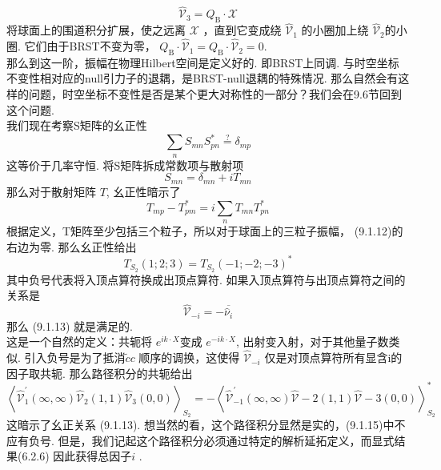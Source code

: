 \begin{equation}
	\hat{\mathcal{V}}_{3}=Q_{\mathrm{B}} \cdot \mathscr{X}
\end{equation}
将球面上的围道积分扩展，使之远离 $\mathscr{X}$ ，直到它变成绕 $\hat{\mathscr{V}}_{1}$ 的小圈加上绕 $\hat{\mathscr{V}}_{2}$的小圈. 它们由于BRST不变为零， $Q_{\mathrm{B}} \cdot \hat{\mathscr{V}}_{1}=Q_{\mathrm{B}} \cdot \hat{\mathscr{V}}_{2}=0$.\\
那么到这一阶，振幅在物理Hilbert空间是定义好的. 即BRST上同调. 与时空坐标不变性相对应的null引力子的退耦，是BRST-null退耦的特殊情况. 那么自然会有这样的问题，时空坐标不变性是否是某个更大对称性的一部分？我们会在9.6节回到这个问题. \\
我们现在考察S矩阵的幺正性
\begin{equation}
	\sum_{n} S_{m n} S_{p n}^{*} \stackrel{?}{=} \delta_{m p}
\end{equation}
这等价于几率守恒. 将S矩阵拆成常数项与散射项
\begin{equation}
	S_{m n}=\delta_{m n}+i T_{m n}
\end{equation}
那么对于散射矩阵 $T$, 幺正性暗示了
\begin{equation}
	T_{m p}-T_{p m}^{*}=i \sum_{n} T_{m n} T_{p n}^{*}
\end{equation}
根据定义，T矩阵至少包括三个粒子，所以对于球面上的三粒子振幅， (9.1.12)的右边为零. 那么幺正性给出
\begin{equation}
	T_{S_{2}}(1 ; 2 ; 3)=T_{S_{2}}(-1 ;-2 ;-3)^{*}
\end{equation}
其中负号代表将入顶点算符换成出顶点算符. 如果入顶点算符与出顶点算符之间的关系是
\begin{equation}
	\hat{\mathscr{V}}_{-i}=-\overline{\hat{\nu}_{i}}
\end{equation}
那么 (9.1.13) 就是满足的.\\
这是一个自然的定义：共轭将 $e^{i k \cdot X}$变成 $e^{-i k \cdot X}$, 出射变入射，对于其他量子数类似. 引入负号是为了抵消$\tilde{c} c$ 顺序的调换，这使得 $\hat{\mathscr{V}}_{-i}$ 仅是对顶点算符所有显含i的因子取共轭. 那么路径积分的共轭给出
\begin{equation}
	\left\langle\hat{\mathscr{V}}_{1}^{\prime}(\infty, \infty) \hat{\mathscr{V}}_{2}(1,1) \hat{\mathscr{V}}_{3}(0,0)\right\rangle_{S_{2}}=-\left\langle\hat{\mathscr{V}}_{-1}^{\prime}(\infty, \infty) \hat{\mathscr{V}}-2(1,1) \hat{\mathscr{V}}-3(0,0)\right\rangle_{S_{2}}^{*}
\end{equation}
这暗示了幺正关系 (9.1.13). 想当然的看，这个路径积分显然是实的，(9.1.15)中不应有负号. 但是，我们记起这个路径积分必须通过特定的解析延拓定义，而显式结果(6.2.6) 因此获得总因子$i$ .

